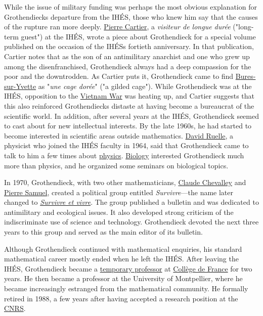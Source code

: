 While the issue of military funding was perhaps the most obvious explanation for Grothendieck\textquotesingle s departure from the IHÉS, those who knew him say that the causes of the rupture ran more deeply. \href{https://en.wikipedia.org/wiki/Pierre_Cartier_(mathematician)}{Pierre Cartier}, a \emph{visiteur de longue durée} ("long-term guest") at the IHÉS, wrote a piece about Grothendieck for a special volume published on the occasion of the IHÉS\textquotesingle s fortieth anniversary. In that publication, Cartier notes that as the son of an antimilitary anarchist and one who grew up among the disenfranchised, Grothendieck always had a deep compassion for the poor and the downtrodden. As Cartier puts it, Grothendieck came to find \href{https://en.wikipedia.org/wiki/Bures-sur-Yvette}{Bures-sur-Yvette} as "\emph{une cage dorée}" ("a gilded cage"). While Grothendieck was at the IHÉS, opposition to the \href{https://en.wikipedia.org/wiki/Vietnam_War}{Vietnam War} was heating up, and Cartier suggests that this also reinforced Grothendieck\textquotesingle s distaste at having become a bureaucrat of the scientific world. In addition, after several years at the IHÉS, Grothendieck seemed to cast about for new intellectual interests. By the late 1960s, he had started to become interested in scientific areas outside mathematics. \href{https://en.wikipedia.org/wiki/David_Ruelle}{David Ruelle}, a physicist who joined the IHÉS faculty in 1964, said that Grothendieck came to talk to him a few times about \href{https://en.wikipedia.org/wiki/Physics}{physics}. \href{https://en.wikipedia.org/wiki/Biology}{Biology} interested Grothendieck much more than physics, and he organized some seminars on biological topics.

In 1970, Grothendieck, with two other mathematicians, \href{https://en.wikipedia.org/wiki/Claude_Chevalley}{Claude Chevalley} and \href{https://en.wikipedia.org/wiki/Pierre_Samuel}{Pierre Samuel}, created a political group entitled \emph{Survivre}---the name later changed to \emph{\href{https://en.wikipedia.org/wiki/Survivre_et_vivre}{Survivre et vivre}}. The group published a bulletin and was dedicated to antimilitary and ecological issues. It also developed strong criticism of the indiscriminate use of science and technology. Grothendieck devoted the next three years to this group and served as the main editor of its bulletin.

Although Grothendieck continued with mathematical enquiries, his standard mathematical career mostly ended when he left the IHÉS. After leaving the IHÉS, Grothendieck became a \href{https://en.wikipedia.org/wiki/Temporary_professor}{temporary professor} at \href{https://en.wikipedia.org/wiki/Collège_de_France}{Collège de France} for two years. He then became a professor at the University of Montpellier, where he became increasingly estranged from the mathematical community. He formally retired in 1988, a few years after having accepted a research position at the \href{https://en.wikipedia.org/wiki/Centre_National_de_la_Recherche_Scientifique}{CNRS}.


